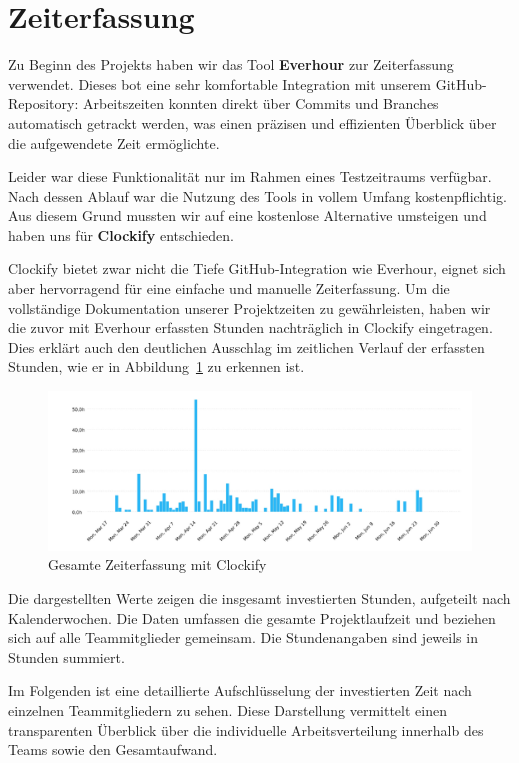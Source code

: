 \documentclass[11pt,a4paper]{article}
\begin{document}
\newpage
\section{Zeiterfassung}

Zu Beginn des Projekts haben wir das Tool \textbf{Everhour}\cite{everhour} zur Zeiterfassung verwendet. Dieses bot eine sehr komfortable Integration mit unserem GitHub-Repository: Arbeitszeiten konnten direkt über Commits und Branches automatisch getrackt werden, was einen präzisen und effizienten Überblick über die aufgewendete Zeit ermöglichte.

Leider war diese Funktionalität nur im Rahmen eines Testzeitraums verfügbar. Nach dessen Ablauf war die Nutzung des Tools in vollem Umfang kostenpflichtig. Aus diesem Grund mussten wir auf eine kostenlose Alternative umsteigen und haben uns für \textbf{Clockify}\cite{clockify} entschieden.

Clockify bietet zwar nicht die Tiefe GitHub-Integration wie Everhour, eignet sich aber hervorragend für eine einfache und manuelle Zeiterfassung. Um die vollständige Dokumentation unserer Projektzeiten zu gewährleisten, haben wir die zuvor mit Everhour erfassten Stunden nachträglich in Clockify eingetragen. Dies erklärt auch den deutlichen Ausschlag im zeitlichen Verlauf der erfassten Stunden, wie er in Abbildung~\ref{fig:zeiterfassung} zu erkennen ist.

\begin{figure}[H]
    \centering
    \includegraphics[width=\textwidth]{images/clockify_diagram.png}
    \caption{Gesamte Zeiterfassung mit Clockify}
    \label{fig:zeiterfassung}
\end{figure}

Die dargestellten Werte zeigen die insgesamt investierten Stunden, aufgeteilt nach Kalenderwochen. Die Daten umfassen die gesamte Projektlaufzeit und beziehen sich auf alle Teammitglieder gemeinsam. Die Stundenangaben sind jeweils in Stunden summiert.

Im Folgenden ist eine detaillierte Aufschlüsselung der investierten Zeit nach einzelnen Teammitgliedern zu sehen. Diese Darstellung vermittelt einen transparenten Überblick über die individuelle Arbeitsverteilung innerhalb des Teams sowie den Gesamtaufwand.
\end{document}
